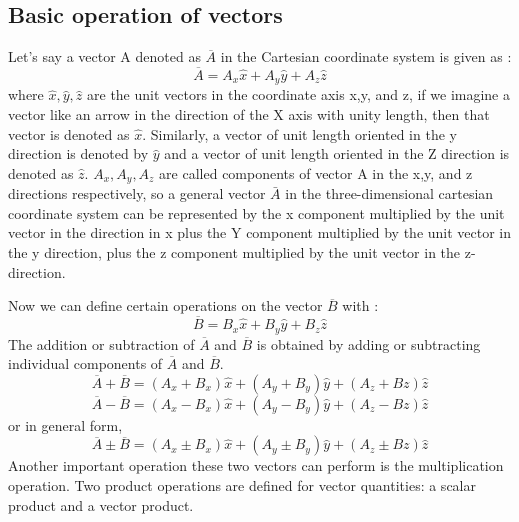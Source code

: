\subsection{Basic operation of vectors}
Let's say a vector A denoted as $\overline{A}$ in the Cartesian coordinate system is given as :
\begin{equation}
\overline{A} = A_{x}\hat{x} + A_{y}\hat{y} + A_{z}\hat{z} 
\end{equation}
where $\hat{x},\hat{y},\hat{z}$ are the unit vectors in the coordinate axis x,y, and z, if we imagine a vector like an arrow in the direction of the X axis with unity length, then that vector is denoted as $\hat{x}$. Similarly, a vector of unit length oriented in the y direction is denoted by $\hat{y}$ and a vector of unit length oriented in the Z direction is denoted as $\hat{z}$. $A_{x}, A_{y}, A_{z}$ are called components of vector A in the x,y, and z directions respectively, so a general vector $\bar{A}$ in the three-dimensional cartesian coordinate system can be represented by the x component multiplied by the unit vector in the direction in x plus the Y component multiplied by the unit vector in the y direction, plus the z component multiplied by the unit vector in the z-direction.

Now we can define certain operations on the vector $\overline{B}$ with : 
\begin{equation}
\overline{B} = B_{x}\hat{x} + B_{y}\hat{y} + B_{z}\hat{z} 
\end{equation} 
The addition or subtraction of $\overline{A}$ and $\overline{B}$ is obtained by adding or subtracting individual components of $\overline{A}$ and $\overline{B}$.
\begin{equation}
\overline{A} + \overline{B} = (A_{x} + B_{x} )\hat{x} + (A_{y} + B_{y})\hat{y} +(A_{z} + B{z})\hat{z} 
\end{equation}
\begin{equation}
\overline{A} - \overline{B} = (A_{x} - B_{x} )\hat{x} + (A_{y} - B_{y})\hat{y} +(A_{z} - B{z})\hat{z}
\end{equation}
or in general form,
\begin{equation}
\overline{A} \pm \overline{B} = (A_{x} \pm B_{x} )\hat{x} + (A_{y} \pm B_{y})\hat{y} +(A_{z} \pm B{z})\hat{z}
\end{equation}
Another important operation these two vectors can perform is the multiplication operation. Two product operations are defined for vector quantities: a scalar product and a vector product.

